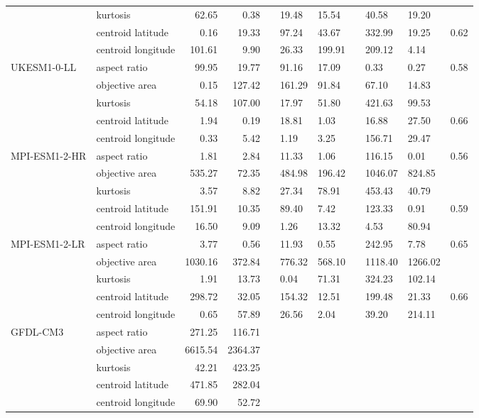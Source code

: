 \begin{longtable}{llrrlllllll}
 & kurtosis & 62.65 & 0.38 &  & 19.48 & 15.54 &  & 40.58 & 19.20 &  \\
 & centroid latitude & 0.16 & 19.33 &  & 97.24 & 43.67 &  & 332.99 & 19.25 & 0.62 \\
 & centroid longitude & 101.61 & 9.90 &  & 26.33 & 199.91 &  & 209.12 & 4.14 &  \\
\cline{1-11}
\multirow[t]{5}{*}{UKESM1-0-LL} & aspect ratio & 99.95 & 19.77 &  & 91.16 & 17.09 &  & 0.33 & 0.27 & 0.58 \\
 & objective area & 0.15 & 127.42 &  & 161.29 & 91.84 &  & 67.10 & 14.83 &  \\
 & kurtosis & 54.18 & 107.00 &  & 17.97 & 51.80 &  & 421.63 & 99.53 &  \\
 & centroid latitude & 1.94 & 0.19 &  & 18.81 & 1.03 &  & 16.88 & 27.50 & 0.66 \\
 & centroid longitude & 0.33 & 5.42 &  & 1.19 & 3.25 &  & 156.71 & 29.47 &  \\
\cline{1-11}
\multirow[t]{5}{*}{MPI-ESM1-2-HR} & aspect ratio & 1.81 & 2.84 &  & 11.33 & 1.06 &  & 116.15 & 0.01 & 0.56 \\
 & objective area & 535.27 & 72.35 &  & 484.98 & 196.42 &  & 1046.07 & 824.85 &  \\
 & kurtosis & 3.57 & 8.82 &  & 27.34 & 78.91 &  & 453.43 & 40.79 &  \\
 & centroid latitude & 151.91 & 10.35 &  & 89.40 & 7.42 &  & 123.33 & 0.91 & 0.59 \\
 & centroid longitude & 16.50 & 9.09 &  & 1.26 & 13.32 &  & 4.53 & 80.94 &  \\
\cline{1-11}
\multirow[t]{5}{*}{MPI-ESM1-2-LR} & aspect ratio & 3.77 & 0.56 &  & 11.93 & 0.55 &  & 242.95 & 7.78 & 0.65 \\
 & objective area & 1030.16 & 372.84 &  & 776.32 & 568.10 &  & 1118.40 & 1266.02 &  \\
 & kurtosis & 1.91 & 13.73 &  & 0.04 & 71.31 &  & 324.23 & 102.14 &  \\
 & centroid latitude & 298.72 & 32.05 &  & 154.32 & 12.51 &  & 199.48 & 21.33 & 0.66 \\
 & centroid longitude & 0.65 & 57.89 &  & 26.56 & 2.04 &  & 39.20 & 214.11 &  \\
\cline{1-11}
\multirow[t]{5}{*}{GFDL-CM3} & aspect ratio & 271.25 & 116.71 &  &  &  &  &  &  &  \\
 & objective area & 6615.54 & 2364.37 &  &  &  &  &  &  &  \\
 & kurtosis & 42.21 & 423.25 &  &  &  &  &  &  &  \\
 & centroid latitude & 471.85 & 282.04 &  &  &  &  &  &  &  \\
 & centroid longitude & 69.90 & 52.72 &  &  &  &  &  &  &  \\
\cline{1-11}
\end{longtable}

